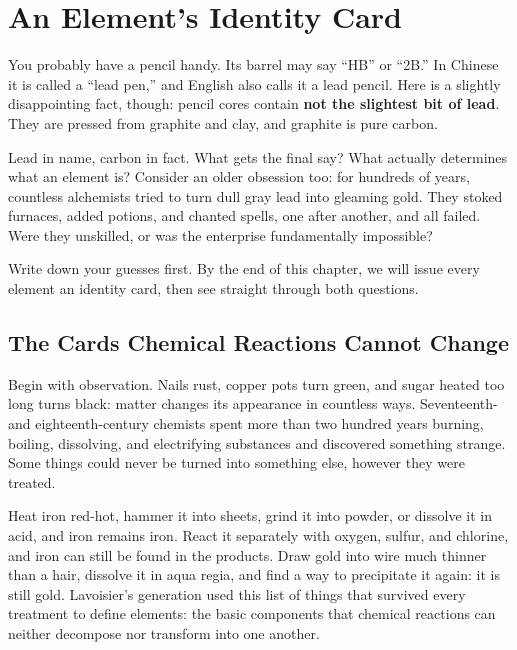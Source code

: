 \chapter{An Element's Identity Card}

\begin{kaichang}
You probably have a pencil handy. Its barrel may say ``HB'' or ``2B.'' In Chinese it is called a ``lead pen,'' and English also calls it a lead pencil. Here is a slightly disappointing fact, though: pencil cores contain \textbf{not the slightest bit of lead}. They are pressed from graphite and clay, and graphite is pure carbon.

Lead in name, carbon in fact. What gets the final say? What actually determines what an element is? Consider an older obsession too: for hundreds of years, countless alchemists tried to turn dull gray lead into gleaming gold. They stoked furnaces, added potions, and chanted spells, one after another, and all failed. Were they unskilled, or was the enterprise fundamentally impossible?

Write down your guesses first. By the end of this chapter, we will issue every element an identity card, then see straight through both questions.
\end{kaichang}

\section{The Cards Chemical Reactions Cannot Change}

Begin with observation. Nails rust, copper pots turn green, and sugar heated too long turns black: matter changes its appearance in countless ways. Seventeenth- and eighteenth-century chemists spent more than two hundred years burning, boiling, dissolving, and electrifying substances and discovered something strange. Some things could never be turned into something else, however they were treated.

Heat iron red-hot, hammer it into sheets, grind it into powder, or dissolve it in acid, and iron remains iron. React it separately with oxygen, sulfur, and chlorine, and iron can still be found in the products. Draw gold into wire much thinner than a hair, dissolve it in aqua regia, and find a way to precipitate it again: it is still gold. Lavoisier's generation used this list of things that survived every treatment to define elements: the basic components that chemical reactions can neither decompose nor transform into one another.


